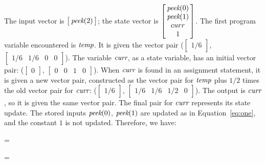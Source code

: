 \noindent The input vector is $\left [\hspace{-3.2pt}\begin{array} {c} \mbox{\it peek}(2) \end{array}
\hspace{-3.2pt}\right]$; the state vector is $\left [\hspace{-3.2pt}\begin{array} {c} \mbox{\it peek}(0) \\ \mbox{\it peek}(1) \\ curr \\ 1 \end{array} \hspace{-3.2pt}\right]$. The first program
variable encountered is $\mbox{\it temp}$. It is given the vector pair
($\left [ \begin{array} {c} 1/6 \end{array} \right ]$, $\left [
\begin{array} {cccc} 1/6 & 1/6 & 0 & 0 \end{array} \right ]$). The
variable $\mbox{\it curr}$, as a state variable, has an initial vector pair:
($\left [ \begin{array} {c} 0 \end{array} \right ]$, $\left
[\begin{array} {cccc} 0 & 0 & 1 & 0
\end{array} \right ]$). When $\mbox{\it curr}$ is found in an assignment
statement, it is given a new vector pair, constructed as the vector
pair for $\mbox{\it temp}$ plus $1/2$ times the old vector pair for $\mbox{\it curr}$:
($\left [ \begin{array} {c} 1/6 \end{array} \right ]$, $\left [
\begin{array} {cccc} 1/6 & 1/6 & 1/2 & 0 \end{array}
\right ]$). The output is $\mbox{\it curr}$, so it is given the same vector
pair. The final pair for $\mbox{\it curr}$ represents its state update. The
stored inputs $\mbox{\it peek}(0)$, $\mbox{\it peek}(1)$ are updated as in
Equation~\ref{eq:one}, and the constant $1$ is not updated. Therefore,
we have:

\begin{minipage}{1.6in}
\starteqnstar
{} = 
\doneeqnstar
\end{minipage}
\begin{minipage}{1.4in}
\starteqnstar
{} = \left [ \begin{array} {c} 0 \\ 1 \\ 1/6 \\ 0
\end{array} \right ]
\doneeqnstar
\end{minipage}


